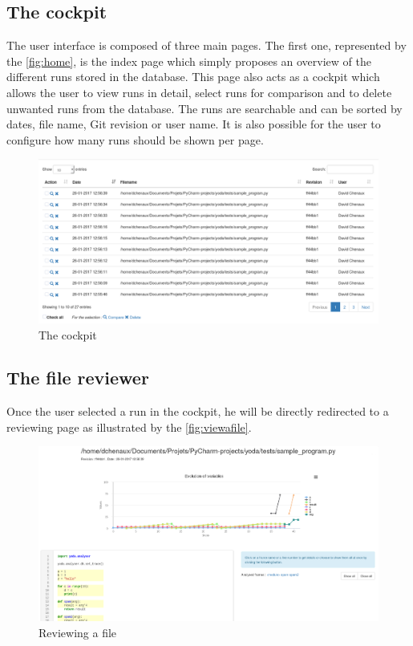 \subsection{The cockpit}
The user interface is composed of three main pages. The first one, represented by the \autoref{fig:home}, is the index page which simply proposes an overview of the different runs stored in the database. This page also acts as a cockpit which allows the user to view runs in detail, select runs for comparison and to delete unwanted runs from the database. The runs are searchable and can be sorted by dates, file name, Git revision or user name. It is also possible for the user to configure how many runs should be shown per page.
\begin{figure}[h!]
  \centering
    \includegraphics[width=\textwidth]{figures/yoda-home.png}
    \caption{The cockpit}
    \label{fig:home}
\end{figure}

\subsection{The file reviewer}
Once the user selected a run in the cockpit, he will be directly redirected to a reviewing page as illustrated by the \autoref{fig:viewafile}. 
\begin{figure}[h!]
  \centering
    \includegraphics[width=\textwidth]{figures/yoda-file.png}
    \caption{Reviewing a file}
    \label{fig:viewafile}
\end{figure}

